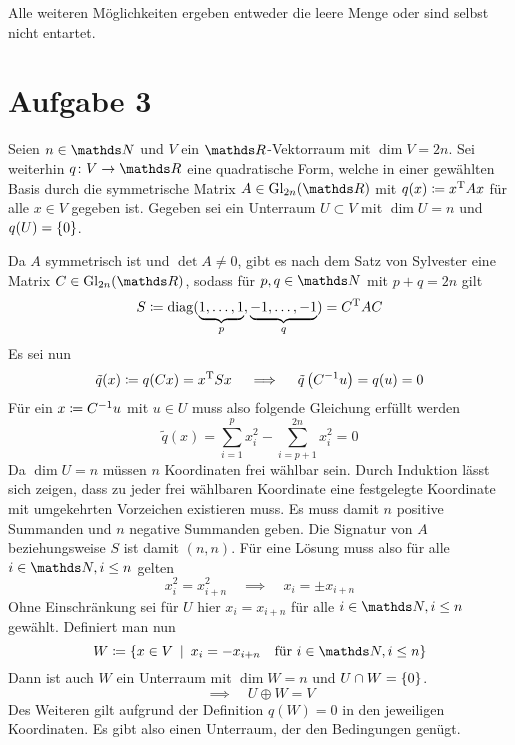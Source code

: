		Alle weiteren Möglichkeiten ergeben entweder die leere Menge oder sind selbst nicht entartet.


	\section*{Aufgabe 3} %
	\label{sec:aufgabe_3}
	
		Seien $n\in\SN$ und $V$ ein $\SR$-Vektorraum mit $\dim V = 2n$.
		Sei weiterhin $\func{q}{V}{\SR}$ eine quadratische Form, welche in einer gewählten Basis durch die symmetrische Matrix $A\in\m{Gl}_{2n}(\SR)$ mit $q(x)\coloneqq {x}^{\mathrm{T}}Ax$ für alle $x\in V$ gegeben ist.
		Gegeben sei ein Unterraum $U\subset V$ mit $\dim U = n$ und $q(U)=\left\{ 0 \right\}$.

		Da $A$ symmetrisch ist und $\det A \neq 0$, gibt es nach dem Satz von Sylvester eine Matrix $C\in\m{Gl}_{2n}(\SR)$, sodass für $p,q\in\SN$ mit $p+q=2n$ gilt
		\[ S \coloneqq \operatorname{diag}( \underbrace{1,\ldots,1}_p,\underbrace{-1,\ldots,-1}_q ) = {C}^{\mathrm{T}}AC \]
		Es sei nun
		\[ \tilde{q}(x) \coloneqq q(Cx) = {x}^{\mathrm{T}}Sx \quad \implies \quad \tilde{q}\left( {C}^{-1}u \right)=q(u)=0 \]
		Für ein $x\coloneqq {C}^{-1}u$ mit $u\in U$ muss also folgende Gleichung erfüllt werden
		\[ \tilde{q}(x) = \sum_{i=1}^p x_i^2 - \sum_{i=p+1}^{2n} x_i^2 = 0 \]
		Da $\dim U = n$ müssen $n$ Koordinaten frei wählbar sein.
		Durch Induktion lässt sich zeigen, dass zu jeder frei wählbaren Koordinate eine festgelegte Koordinate mit umgekehrten Vorzeichen existieren muss.
		Es muss damit $n$ positive Summanden und $n$ negative Summanden geben.
		Die Signatur von $A$ beziehungsweise $S$ ist damit $(n,n)$.
		Für eine Lösung muss also für alle $i\in\SN,i\leq n$ gelten
		\[ x_i^2 = x_{i+n}^2 \quad \implies \quad x_i = \pm x_{i+n} \]
		Ohne Einschränkung sei für $U$ hier $x_i=x_{i+n}$ für alle $i\in\SN,i\leq n$ gewählt.
		Definiert man nun
		\[ W \define \set{x\in V}{ x_i=-x_{i+n}\quad \text{für } i\in\SN,i\leq n } \]
		Dann ist auch $W$ ein Unterraum mit $\dim W = n$ und $U\cap W=\left\{ 0 \right\}$.
		\[ \implies \quad U\oplus W = V \]
		Des Weiteren gilt aufgrund der Definition $q(W) = 0$ in den jeweiligen Koordinaten.
		Es gibt also einen Unterraum, der den Bedingungen genügt.

